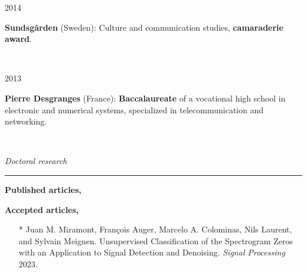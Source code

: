 \documentclass[a4paper,10pt]{article}
\begin{document}
	\noindent
	\begin{minipage}{0.20\textwidth}
		\color{MyGray} 2014
	\end{minipage}
	\hfill
	\begin{minipage}{0.70\textwidth}
		\textbf{Sundsgården} (Sweden): Culture and communication studies, \textbf{camaraderie award}.
	\end{minipage}\\
	\vspace{2mm}
	
	\noindent
	\begin{minipage}{0.20\textwidth}
		\color{MyGray} 2013
	\end{minipage}
	\hfill
	\begin{minipage}{0.70\textwidth}
		\textbf{Pierre Desgranges} (France): \textbf{Baccalaureate} of a vocational high school in electronic and numerical systems, specialized in telecommunication and networking.
	\end{minipage}\\
	\vspace{5mm}
	
	\noindent
	\textit{\Large \color{MyGray} \hspace{5mm} Doctoral research}
	\vspace{2mm}
	{\color{DefaultGray}\hrule height .1pt}
	\vspace{5mm}
	
	\textbf{Published articles,}
	\nocite{*}
	
	
	\vspace{5mm}
	
	\textbf{Accepted articles,}
	\begin{itemize}
		\item[*] Juan M. Miramont, François Auger, Marcelo A. Colominas, Nils Laurent, and Sylvain Meignen. Unsupervised Classification of the Spectrogram Zeros with an Application to Signal Detection and Denoising. \textit{Signal Processing} 2023.
	\end{itemize}
	\vspace{5mm}
	
	
\end{document}
